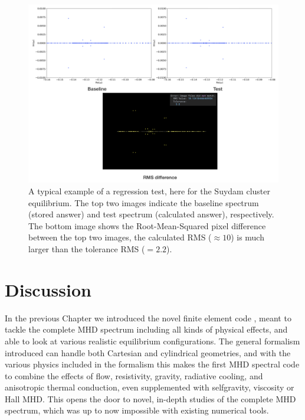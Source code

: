 \begin{figure}[t]
  \centering
  \includegraphics[width=\textwidth]{regression_testing.png}
  \caption{
    A typical example of a {\legolas} regression test, here for the Suydam cluster equilibrium. The top two images indicate the baseline spectrum (stored answer) and test spectrum (calculated answer), respectively. The bottom image shows the Root-Mean-Squared pixel difference between the top two images, the calculated RMS ($\approx 10$) is much larger than the tolerance RMS ($= 2.2$).
  }
  \label{fig: regression_test}
\end{figure}

\section{Discussion} \label{ss: legolas_discussion}
In the previous Chapter we introduced the novel finite element code {\legolas}, meant to tackle the complete MHD spectrum including all kinds of physical effects, and able to look at various realistic equilibrium configurations. The general formalism introduced can handle both Cartesian and cylindrical geometries, and with the various physics included in the formalism this makes {\legolas} the first MHD spectral code to combine the effects of flow, resistivity, gravity, radiative cooling, and anisotropic thermal conduction, even supplemented with selfgravity, viscosity or Hall MHD. This opens the door to novel, in-depth studies of the complete MHD spectrum, which was up to now impossible with existing numerical tools.


